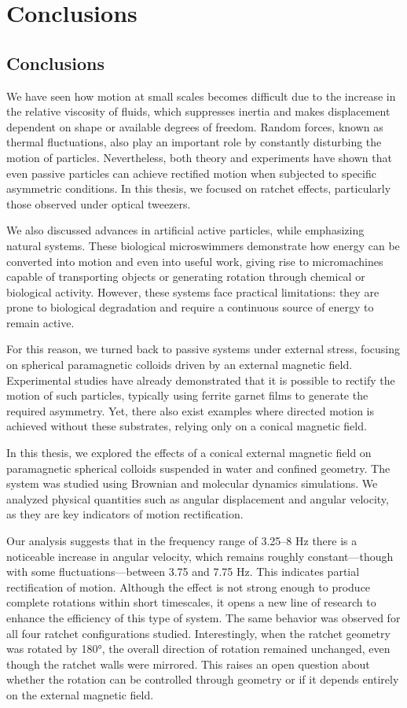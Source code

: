 \part{Conclusions}
\label{part:conclusions}

\chapter{Conclusions}

We have seen how motion at small scales becomes difficult due to the increase in the relative viscosity of fluids, which suppresses inertia and makes displacement dependent on shape or available degrees of freedom. Random forces, known as thermal fluctuations, also play an important role by constantly disturbing the motion of particles. Nevertheless, both theory and experiments have shown that even passive particles can achieve rectified motion when subjected to specific asymmetric conditions. In this thesis, we focused on ratchet effects, particularly those observed under optical tweezers.

We also discussed advances in artificial active particles, while emphasizing natural systems. These biological microswimmers demonstrate how energy can be converted into motion and even into useful work, giving rise to micromachines capable of transporting objects or generating rotation through chemical or biological activity. However, these systems face practical limitations: they are prone to biological degradation and require a continuous source of energy to remain active.

For this reason, we turned back to passive systems under external stress, focusing on spherical paramagnetic colloids driven by an external magnetic field. Experimental studies have already demonstrated that it is possible to rectify the motion of such particles, typically using ferrite garnet films to generate the required asymmetry. Yet, there also exist examples where directed motion is achieved without these substrates, relying only on a conical magnetic field.

In this thesis, we explored the effects of a conical external magnetic field on paramagnetic spherical colloids suspended in water and confined geometry. The system was studied using Brownian and molecular dynamics simulations. We analyzed physical quantities such as angular displacement and angular velocity, as they are key indicators of motion rectification.

Our analysis suggests that in the frequency range of 3.25–8 Hz there is a noticeable increase in angular velocity, which remains roughly constant—though with some fluctuations—between 3.75 and 7.75 Hz. This indicates partial rectification of motion. Although the effect is not strong enough to produce complete rotations within short timescales, it opens a new line of research to enhance the efficiency of this type of system. The same behavior was observed for all four ratchet configurations studied. Interestingly, when the ratchet geometry was rotated by 180°, the overall direction of rotation remained unchanged, even though the ratchet walls were mirrored. This raises an open question about whether the rotation can be controlled through geometry or if it depends entirely on the external magnetic field.

